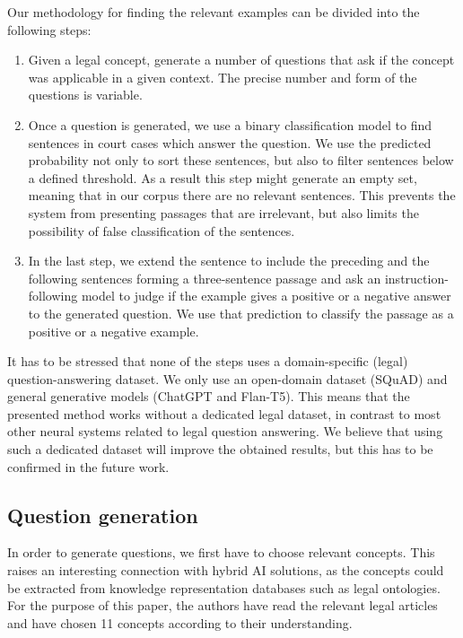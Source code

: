 Our methodology for finding the relevant examples can be divided into the following steps:
\begin{enumerate}
  \item Given a legal concept, generate a number of questions that ask if the concept was applicable in a given context. The precise number and form of the questions is variable.
  \item Once a question is generated, we use a binary classification model to find sentences in court cases which answer the question. 
    We use the predicted probability not only to sort these sentences, but also to filter sentences below a defined threshold.
    As a result this step might generate an empty set, meaning that in our corpus there are no relevant sentences. 
    This prevents the system from presenting passages that are irrelevant, but also limits the possibility of false
    classification of the sentences.
  \item In the last step, we extend the sentence to include the preceding and the following sentences forming a three-sentence passage
    and ask an instruction-following model to judge if the example gives a positive or a negative answer to the generated question.
    We use that prediction to classify the passage as a positive or a negative example.
\end{enumerate}

It has to be stressed that none of the steps uses a domain-specific (legal) question-answering dataset. We only use an open-domain dataset (SQuAD) and general generative models (ChatGPT and Flan-T5). 
This means that the presented method works without a dedicated legal dataset, in contrast to most other neural systems related to legal question answering. We believe that using such a dedicated dataset will improve the obtained results, but this has to be confirmed in the future work.


\subsection{Question generation}

In order to generate questions, we first have to choose relevant concepts. This raises an interesting connection with hybrid AI solutions, as the concepts could be extracted from knowledge representation databases such as legal ontologies. For the purpose of this paper, the authors have read the relevant legal articles and have chosen 11 concepts according to their understanding.


